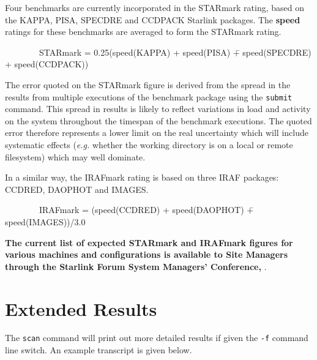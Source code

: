 Four benchmarks are currently incorporated in the STARmark rating,
based on the KAPPA, PISA, SPECDRE and CCDPACK Starlink packages. The
{\bf speed} ratings for these benchmarks are averaged to form the 
STARmark rating.

\begin{tabbing}
~~~~~~~~STARmark = 0.25(speed(KAPPA) + speed(PISA) \=+ speed(SPECDRE)  \\
                                                     \>+ speed(CCDPACK))
\end{tabbing}

The error quoted on the STARmark figure is derived from the spread in
the results from multiple executions of the benchmark package using the
{\tt submit} command.  This spread in results is likely to reflect
variations in load and activity on the system throughout the timespan
of the benchmark executions. The quoted error therefore represents a
lower limit on the real uncertainty which will include systematic
effects ({\em e.g.} whether the working directory is on a local or
remote filesystem) which may well dominate.

In a similar way, the IRAFmark rating is based on three IRAF
packages: CCDRED, DAOPHOT and IMAGES.

\begin{tabbing}
~~~~~~~~IRAFmark = (speed(CCDRED) + speed(DAOPHOT) \=+ speed(IMAGES))/3.0  \\
\end{tabbing}


{\bf The current list of expected STARmark and IRAFmark figures for various
machines and configurations is available to Site Managers through the
Starlink Forum System Managers' Conference, }.


\section{Extended Results}
\label{results}

The {\tt scan} command will print out more detailed results if given
the {\tt -f} command line switch. An example transcript is given below.
 

